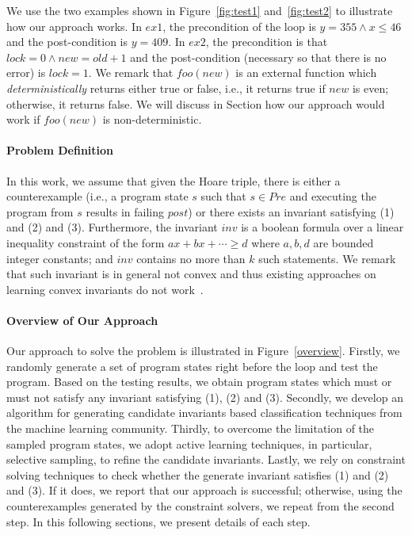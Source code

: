 \begin{example}
We use the two examples shown in Figure~\ref{fig:test1} and~\ref{fig:test2} to illustrate how our approach works. In $ex1$, the precondition of the loop is $y = 355 \land x \leq 46$ and the post-condition is $y=409$. In $ex2$, the precondition is that $lock=0 \land new=old+1$ and the post-condition (necessary so that there is no error) is $lock=1$. We remark that $foo(new)$ is an external function which \emph{deterministically} returns either true or false, i.e., it returns true if $new$ is even; otherwise, it returns false. We will discuss in Section how our approach would work if $foo(new)$ is non-deterministic.
\end{example}

\paragraph{Problem Definition} In this work, we assume that given the Hoare triple, there is either a counterexample (i.e., a program state $s$ such that $s \in Pre$ and executing the program from $s$ results in failing $post$) or there exists an invariant satisfying (1) and (2) and (3). Furthermore, the invariant $inv$ is a boolean formula over a linear inequality constraint of the form $ax + bx + \cdots \geq d$ where $a,b,d$ are bounded integer constants; and $inv$ contains no more than $k$ such statements. We remark that such invariant is in general not convex and thus existing approaches on learning convex invariants do not work~\cite{}.

\paragraph{Overview of Our Approach} Our approach to solve the problem is illustrated in Figure~\ref{overview}. Firstly, we randomly generate a set of program states right before the loop and test the program. Based on the testing results, we obtain program states which must or must not satisfy any invariant satisfying (1), (2) and (3). Secondly, we develop an algorithm for generating candidate invariants based classification techniques from the machine learning community. Thirdly, to overcome the limitation of the sampled program states, we adopt active learning techniques, in particular, selective sampling, to refine the candidate invariants. Lastly, we rely on constraint solving techniques to check whether the generate invariant satisfies (1) and (2) and (3). If it does, we report that our approach is successful; otherwise, using the counterexamples generated by the constraint solvers, we repeat from the second step. In this following sections, we present details of each step.
